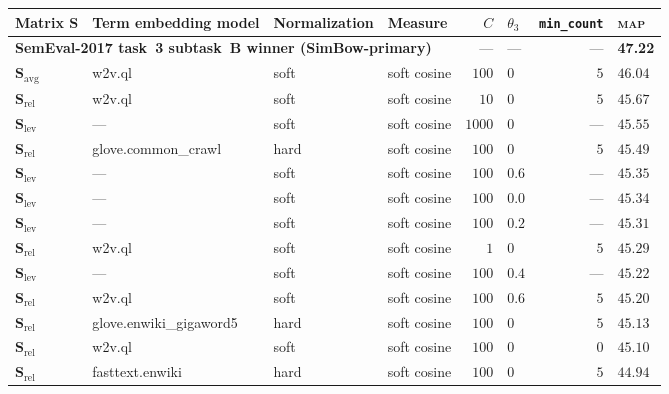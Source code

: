 \documentclass[
  digital, %
  notable, %
  lof,     %
  lot,     %
  nopalatino, color
]{fithesis3}
\newenvironment{liningfigs}{\renewcommand*{\rmdefault}{zpltlf}\normalfont}{}
\newcommand{\op}[1]{\ensuremath{\operatorname{#1}}}
\newcommand{\avg}{\op{avg}}
\def\abbr#1{\textsc{\MakeLowercase{#1}}}
\begin{document}
\begin{table}
\pagestyle{empty}
\index{.savg@$\mathbf S_{\avg}$}
\centering
\begin{liningfigs}
\footnotesize
\begin{tabular}{llllrlrl}
Matrix $\mathbf S$ &
  Term embedding model &
  Normalization &
  Measure &
  $C$ &
  $\theta_3$ &
  \texttt{min\_count} &
  \abbr{MAP}\index{map@\abbr {MAP}} \\ \toprule
\multicolumn{4}{l}{\bfseries SemEval-2017 task~3 subtask~B winner (SimBow-primary)} &
  --- &
  --- &
  --- &
  \bfseries47.22 \\
$\mathbf S_{\textrm{avg}}$ & w2v.ql & soft & soft cosine & $100$ & $0$ & $5$ & $46.04$ \\
$\mathbf S_{\textrm{rel}}$ & w2v.ql & soft & soft cosine & $10$ & $0$ & $5$ & $45.67$ \\
$\mathbf S_{\textrm{lev}}$ & --- & soft & soft cosine & $1000$ & $0$ & --- & $45.55$ \\
$\mathbf S_{\textrm{rel}}$ & glove.common\_crawl & hard & soft cosine & $100$ & $0$ & $5$ & $45.49$ \\
$\mathbf S_{\textrm{lev}}$ & --- & soft & soft cosine & $100$ & $0.6$ & --- & $45.35$ \\
$\mathbf S_{\textrm{lev}}$ & --- & soft & soft cosine & $100$ & $0.0$ & --- & $45.34$ \\
$\mathbf S_{\textrm{lev}}$ & --- & soft & soft cosine & $100$ & $0.2$ & --- & $45.31$ \\
$\mathbf S_{\textrm{rel}}$ & w2v.ql & soft & soft cosine & $1$ & $0$ & $5$ & $45.29$ \\
$\mathbf S_{\textrm{lev}}$ & --- & soft & soft cosine & $100$ & $0.4$ & --- & $45.22$ \\
$\mathbf S_{\textrm{rel}}$ & w2v.ql & soft & soft cosine & $100$ & $0.6$ & $5$ & $45.20$ \\
$\mathbf S_{\textrm{rel}}$ & glove.enwiki\_gigaword5 & hard & soft cosine & $100$ & $0$ & $5$ & $45.13$ \\
$\mathbf S_{\textrm{rel}}$ & w2v.ql & soft & soft cosine & $100$ & $0$ & $0$ & $45.10$ \\
$\mathbf S_{\textrm{rel}}$ & fasttext.enwiki & hard & soft cosine & $100$ & $0$ & $5$ & $44.94$ \\

\end{tabular}
\end{liningfigs}
\end{table}
\end{document}

